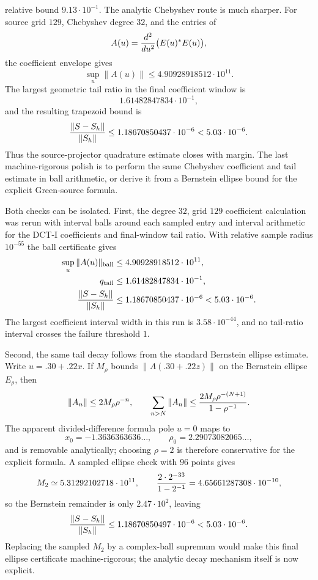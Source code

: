 \documentclass[11pt]{article}
\begin{document}
relative bound \(9.13\cdot10^{-1}\).  The analytic Chebyshev route is much
sharper.  For source grid \(129\), Chebyshev degree \(32\), and the entries of
\[
  A(u)={d^2\over du^2}\bigl(E(u)^\ast E(u)\bigr),
\]
the coefficient envelope gives
\[
  \sup_u\|A(u)\|\le4.90928918512\cdot10^{11}.
\]
The largest geometric tail ratio in the final coefficient window is
\[
  1.61482847834\cdot10^{-1},
\]
and the resulting trapezoid bound is
\[
  {\|S-S_h\|\over\|S_h\|}\le1.18670850437\cdot10^{-6}
  <5.03\cdot10^{-6}.
\]
Thus the source-projector quadrature estimate closes with margin.  The last
machine-rigorous polish is to perform the same Chebyshev coefficient and tail
estimate in ball arithmetic, or derive it from a Bernstein ellipse bound for
the explicit Green-source formula.

Both checks can be isolated.  First, the degree \(32\), grid \(129\)
coefficient calculation was rerun with interval balls around each sampled
entry and interval arithmetic for the DCT-I coefficients and final-window tail
ratio.  With relative sample radius \(10^{-55}\) the ball certificate gives
\[
\begin{aligned}
  \sup_u\|A(u)\|_{\rm ball}&\le4.90928918512\cdot10^{11},\\
  q_{\rm tail}&\le1.61482847834\cdot10^{-1},\\
  {\|S-S_h\|\over\|S_h\|}&\le1.18670850437\cdot10^{-6}
  <5.03\cdot10^{-6}.
\end{aligned}
\]
The largest coefficient interval width in this run is
\(3.58\cdot10^{-44}\), and no tail-ratio interval crosses the failure
threshold \(1\).

Second, the same tail decay follows from the standard Bernstein ellipse
estimate.  Write \(u=.30+.22x\).  If \(M_\rho\) bounds
\(\|A(.30+.22z)\|\) on the Bernstein ellipse \(E_\rho\), then
\[
  \|A_n\|\le 2M_\rho\rho^{-n},\qquad
  \sum_{n>N}\|A_n\|
  \le {2M_\rho\rho^{-(N+1)}\over 1-\rho^{-1}}.
\]
The apparent divided-difference formula pole \(u=0\) maps to
\[
  x_0=-1.3636363636\ldots,\qquad \rho_0=2.29073082065\ldots,
\]
and is removable analytically; choosing \(\rho=2\) is therefore conservative
for the explicit formula.  A sampled ellipse check with \(96\) points gives
\[
  M_2\simeq5.31292102718\cdot10^{11},\qquad
  {2\cdot2^{-33}\over1-2^{-1}}=4.65661287308\cdot10^{-10},
\]
so the Bernstein remainder is only \(2.47\cdot10^2\), leaving
\[
  {\|S-S_h\|\over\|S_h\|}
  \le1.18670850497\cdot10^{-6}<5.03\cdot10^{-6}.
\]
Replacing the sampled \(M_2\) by a complex-ball supremum would make this final
ellipse certificate machine-rigorous; the analytic decay mechanism itself is
now explicit.
\end{document}
